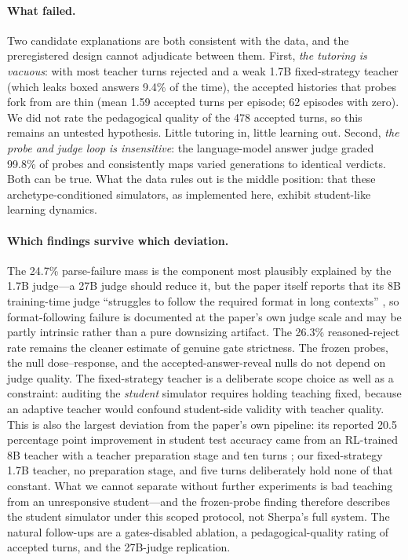 \documentclass[12pt,a4paper]{article}
\begin{document}
\paragraph{What failed.} Two candidate explanations are both consistent with
the data, and the preregistered design cannot adjudicate between them.
First, \emph{the tutoring is vacuous}: with most teacher turns rejected and
a weak 1.7B fixed-strategy teacher (which leaks boxed answers 9.4\% of the
time), the accepted histories that probes fork from are thin (mean 1.59
accepted turns per episode; 62 episodes with zero). We did not rate the
pedagogical quality of the 478 accepted turns, so this remains an untested
hypothesis. Little tutoring in, little learning out. Second, \emph{the
probe and judge loop is insensitive}: the language-model answer judge
graded 99.8\% of probes and consistently maps varied generations to
identical verdicts. Both can be true. What the data rules out is the middle
position: that these archetype-conditioned simulators, as implemented here,
exhibit student-like learning dynamics.

\paragraph{Which findings survive which deviation.} The 24.7\% parse-failure
mass is the component most plausibly explained by the 1.7B judge---a 27B
judge should reduce it, but the paper itself reports that its 8B
training-time judge ``struggles to follow the required format in long
contexts'' \citep{xu2026sherpa}, so format-following failure is documented
at the paper's own judge scale and may be partly intrinsic rather than a
pure downsizing artifact. The 26.3\% reasoned-reject rate remains the
cleaner estimate of genuine gate strictness. The frozen probes, the null
dose--response, and the accepted-answer-reveal nulls do not depend on judge
quality. The fixed-strategy teacher is a deliberate scope choice as well as
a constraint: auditing the \emph{student} simulator requires holding
teaching fixed, because an adaptive teacher would confound student-side
validity with teacher quality. This is also the largest deviation from the
paper's own pipeline: its reported 20.5 percentage point improvement in
student test accuracy came from an RL-trained 8B teacher with a teacher
preparation stage and ten turns \citep{xu2026sherpa}; our fixed-strategy 1.7B
teacher, no preparation stage, and five turns deliberately hold none of that
constant. What we cannot separate without further experiments is bad
teaching from an unresponsive student---and the frozen-probe finding
therefore describes the student simulator under this scoped protocol, not
Sherpa's full system. The natural
follow-ups are a gates-disabled ablation, a pedagogical-quality rating of
accepted turns, and the 27B-judge replication.
\end{document}
